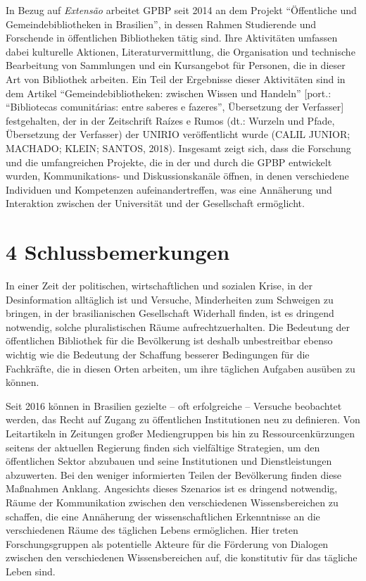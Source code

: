\documentclass[a4paper,
fontsize=11pt,
oneside,
numbers=noperiodatend,
parskip=half-,
bibliography=totoc,
final
]{scrartcl}
\begin{document}
In Bezug auf \emph{Extensão} arbeitet GPBP seit 2014 an dem Projekt
\enquote{Öffentliche und Gemeindebibliotheken in Brasilien}, in dessen
Rahmen Studierende und Forschende in öffentlichen Bibliotheken tätig
sind. Ihre Aktivitäten umfassen dabei kulturelle Aktionen,
Literaturvermittlung, die Organisation und technische Bearbeitung von
Sammlungen und ein Kursangebot für Personen, die in dieser Art von
Bibliothek arbeiten. Ein Teil der Ergebnisse dieser Aktivitäten sind in
dem Artikel \enquote{Gemeindebibliotheken: zwischen Wissen und Handeln}
{[}port.: \enquote{Bibliotecas comunitárias: entre saberes e fazeres},
Übersetzung der Verfasser{]} festgehalten, der in der Zeitschrift Raízes
e Rumos (dt.: Wurzeln und Pfade, Übersetzung der Verfasser) der UNIRIO
veröffentlicht wurde (CALIL JUNIOR; MACHADO; KLEIN; SANTOS, 2018).
Insgesamt zeigt sich, dass die Forschung und die umfangreichen Projekte,
die in der und durch die GPBP entwickelt wurden, Kommunikations- und
Diskussionskanäle öffnen, in denen verschiedene Individuen und
Kompetenzen aufeinandertreffen, was eine Annäherung und Interaktion
zwischen der Universität und der Gesellschaft ermöglicht.

\hypertarget{schlussbemerkungen}{%
\section{4 Schlussbemerkungen}\label{schlussbemerkungen}}

In einer Zeit der politischen, wirtschaftlichen und sozialen Krise, in
der Desinformation alltäglich ist und Versuche, Minderheiten zum
Schweigen zu bringen, in der brasilianischen Gesellschaft Widerhall
finden, ist es dringend notwendig, solche pluralistischen Räume
aufrechtzuerhalten. Die Bedeutung der öffentlichen Bibliothek für die
Bevölkerung ist deshalb unbestreitbar ebenso wichtig wie die Bedeutung
der Schaffung besserer Bedingungen für die Fachkräfte, die in diesen
Orten arbeiten, um ihre täglichen Aufgaben ausüben zu können.

Seit 2016 können in Brasilien gezielte -- oft erfolgreiche -- Versuche
beobachtet werden, das Recht auf Zugang zu öffentlichen Institutionen
neu zu definieren. Von Leitartikeln in Zeitungen großer Mediengruppen
bis hin zu Ressourcenkürzungen seitens der aktuellen Regierung finden
sich vielfältige Strategien, um den öffentlichen Sektor abzubauen und
seine Institutionen und Dienstleistungen abzuwerten. Bei den weniger
informierten Teilen der Bevölkerung finden diese Maßnahmen Anklang.
Angesichts dieses Szenarios ist es dringend notwendig, Räume der
Kommunikation zwischen den verschiedenen Wissensbereichen zu schaffen,
die eine Annäherung der wissenschaftlichen Erkenntnisse an die
verschiedenen Räume des täglichen Lebens ermöglichen. Hier treten
Forschungsgruppen als potentielle Akteure für die Förderung von Dialogen
zwischen den verschiedenen Wissensbereichen auf, die konstitutiv für das
tägliche Leben sind.
\end{document}
